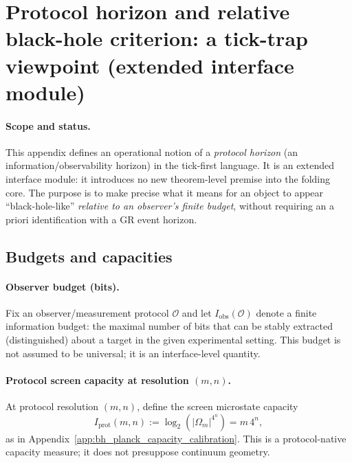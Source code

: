 \section{Protocol horizon and relative black-hole criterion: a tick-trap viewpoint (extended interface module)}
\label{app:protocol_horizon_tick_trap}

\paragraph{Scope and status.}
\AuditTag This appendix defines an operational notion of a \emph{protocol horizon} (an information/observability horizon) in the tick-first language.
It is an extended interface module: it introduces no new theorem-level premise into the folding core.
The purpose is to make precise what it means for an object to appear ``black-hole-like'' \emph{relative to an observer's finite budget}, without requiring an a priori identification with a GR event horizon.

\subsection{Budgets and capacities}
\label{subsec:protocol_horizon_budgets}

\paragraph{Observer budget (bits).}
\InterfaceTag Fix an observer/measurement protocol $\mathcal O$ and let $I_{\mathrm{obs}}(\mathcal O)$ denote a finite information budget: the maximal number of bits that can be stably extracted (distinguished) about a target in the given experimental setting.
This budget is not assumed to be universal; it is an interface-level quantity.

\paragraph{Protocol screen capacity at resolution \texorpdfstring{$(m,n)$}{(m,n)}.}
\InterfaceTag At protocol resolution $(m,n)$, define the screen microstate capacity
\[
I_{\mathrm{prot}}(m,n):=\log_2\!\left(|\Omega_m|^{4^n}\right)=m\,4^n,
\]
as in Appendix~\ref{app:bh_planck_capacity_calibration}.
This is a protocol-native capacity measure; it does not presuppose continuum geometry.

